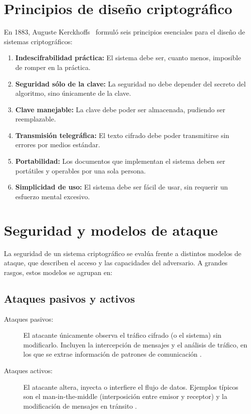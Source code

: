 \section{Principios de diseño criptográfico}

En 1883, Auguste Kerckhoffs~\cite{Petitcolas2011Kerckhoffs} formuló seis principios esenciales para el diseño de sistemas criptográficos:

\begin{enumerate}
  \item \textbf{Indescifrabilidad práctica:} El sistema debe ser, cuanto menos, imposible de romper en la práctica.
  \item \textbf{Seguridad sólo de la clave:} La seguridad no debe depender del secreto del algoritmo, sino únicamente de la clave.
  \item \textbf{Clave manejable:} La clave debe poder ser almacenada, pudiendo ser reemplazable.
  \item \textbf{Transmisión telegráfica:} El texto cifrado debe poder transmitirse sin errores por medios estándar.
  \item \textbf{Portabilidad:} Los documentos que implementan el sistema deben ser portátiles y operables por una sola persona.
  \item \textbf{Simplicidad de uso:} El sistema debe ser fácil de usar, sin requerir un esfuerzo mental excesivo.
\end{enumerate}

\section{Seguridad y modelos de ataque}
La seguridad de un sistema criptográfico se evalúa frente a distintos modelos de ataque, que describen el acceso y las capacidades del adversario. A grandes rasgos, estos modelos se agrupan en:

\subsection{Ataques pasivos y activos}

\begin{description}
  \item[Ataques pasivos:] El atacante únicamente observa el tráfico cifrado (o el sistema) sin modificarlo. Incluyen la intercepción de mensajes y el análisis de tráfico, en los que se extrae información de patrones de comunicación \cite{different_types_cryptography_attacks}\cite{active_and_passive_attacks_in_information_security}.
  \item[Ataques activos:] El atacante altera, inyecta o interfiere el flujo de datos. Ejemplos típicos son el man-in-the-middle (interposición entre emisor y receptor) y la modificación de mensajes en tránsito \cite{what_are_cryptographic_attacks}.
\end{description}

